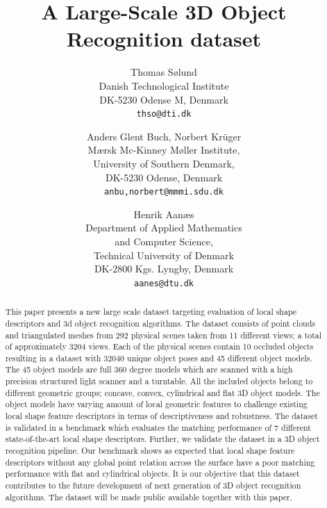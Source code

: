 \documentclass[10pt,twocolumn,letterpaper]{article}
\begin{document}
\title{A Large-Scale 3D Object Recognition dataset}

\author{Thomas S{\o}lund\\
Danish Technological Institute\\
DK-5230 Odense M, Denmark\\
{\tt\small thso@dti.dk}
\and
Anders Glent Buch, Norbert Kr\"u{}ger\\
M\ae{}rsk Mc-Kinney M\o{}ller Institute,\\
University of Southern Denmark,\\
DK-5230 Odense, Denmark \\
{\tt\small anbu,norbert@mmmi.sdu.dk}
\and
Henrik Aan\ae s\\ %
Department of Applied Mathematics\\ and Computer Science,\\ 
Technical University of Denmark\\
DK-2800 Kgs. Lyngby, Denmark\\
{\tt\small aanes@dtu.dk} %
}

\maketitle

\begin{abstract}
This paper presents a new large scale dataset targeting evaluation of local shape descriptors and 3d object recognition algorithms. The dataset consists of point clouds and triangulated meshes from 292 physical scenes taken from 11 different views; a total of approximately 3204 views. Each of the physical scenes contain 10 occluded objects resulting in a dataset with 32040 unique object poses and 45 different object models. The 45 object models are full 360 degree models which are scanned with a high precision structured light scanner and a turntable. All the included objects belong to different geometric groups; concave, convex, cylindrical and flat 3D object models. The object models have varying amount of local geometric features to challenge existing local shape feature descriptors in terms of descriptiveness and robustness.  The dataset is validated in a benchmark which evaluates the matching performance of 7 different state-of-the-art local shape descriptors. Further, we validate the dataset in a 3D object recognition pipeline. Our benchmark shows as expected that local shape feature descriptors without any global point relation across the surface have a poor matching performance with flat and cylindrical objects. It is our objective that this dataset contributes to the future development of next generation of 3D object recognition algorithms. The dataset will be made public available together with this paper.
\end{abstract}
\end{document}
